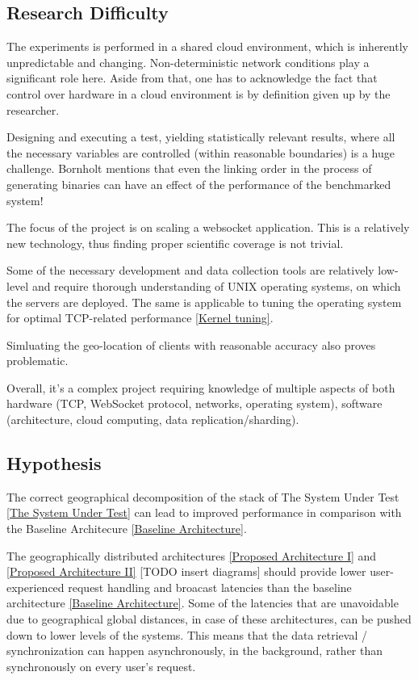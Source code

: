 \documentclass{uvamscse}
\begin{document}
\subsection{Research Difficulty}
The experiments is performed in a shared cloud environment, which is inherently unpredictable and changing. Non-deterministic network conditions play a significant role here. Aside from that, one has to acknowledge the fact that control over hardware in a cloud environment is by definition given up by the researcher.

Designing and executing a test, yielding statistically relevant results, where all the necessary variables are controlled (within reasonable boundaries) is a huge challenge. Bornholt \cite{BornBen} mentions that even the linking order in the process of generating binaries can have an effect of the performance of the benchmarked system!

The focus of the project is on scaling a websocket application. This is a relatively new technology, thus finding proper scientific coverage is not trivial.

Some of the necessary development and data collection tools are relatively low-level and require thorough understanding of UNIX operating systems, on which the servers are deployed. The same is applicable to tuning the operating system for optimal TCP-related performance \ref{Kernel tuning}.

Simluating the geo-location of clients with reasonable accuracy also proves problematic.

Overall, it’s a complex project requiring knowledge of multiple aspects of both hardware (TCP, WebSocket protocol, networks, operating system), software (architecture, cloud computing, data replication/sharding).

\subsection{Hypothesis}
The correct geographical decomposition of the stack of The System Under Test \ref{The System Under Test} can lead to improved performance in comparison with the Baseline Architecure \ref{Baseline Architecture}.

The geographically distributed architectures \ref{Proposed Architecture I} and \ref{Proposed Architecture II} [TODO insert diagrams] should provide lower user-experienced request handling and broacast latencies than the baseline architecture \ref{Baseline Architecture}. Some of the latencies that are unavoidable due to geographical global distances, in case of these architectures, can be pushed down to lower levels of the systems. This means that the data retrieval / synchronization can happen asynchronously, in the background, rather than synchronously on every user's request.
\end{document}
